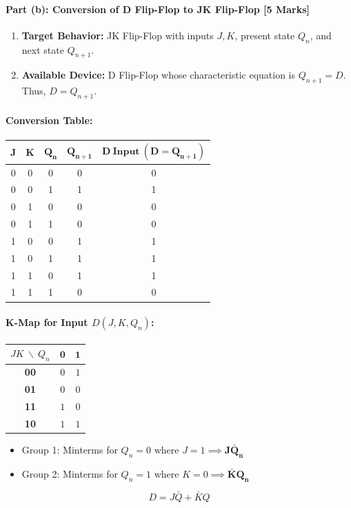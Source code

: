 \documentclass[11pt,a4paper,oneside]{book}
\begin{document}
\paragraph{Part (b): Conversion of D Flip-Flop to JK Flip-Flop [5 Marks]}
\begin{enumerate}
  \item \textbf{Target Behavior:} JK Flip-Flop with inputs $J, K$, present state $Q_n$, and next state $Q_{n+1}$.
  \item \textbf{Available Device:} D Flip-Flop whose characteristic equation is $Q_{n+1} = D$. Thus, $D = Q_{n+1}$.
\end{enumerate}

\paragraph{Conversion Table:}
\begin{center}
\begin{tabular}{|ccc||c||c|}
\hline
$\mathbf{J}$ & $\mathbf{K}$ & $\mathbf{Q_n}$ & $\mathbf{Q_{n+1}}$ & $\mathbf{D\ \text{Input}\ (D = Q_{n+1})}$ \\ \hline
0 & 0 & 0 & 0 & 0 \\ \hline
0 & 0 & 1 & 1 & 1 \\ \hline
0 & 1 & 0 & 0 & 0 \\ \hline
0 & 1 & 1 & 0 & 0 \\ \hline
1 & 0 & 0 & 1 & 1 \\ \hline
1 & 0 & 1 & 1 & 1 \\ \hline
1 & 1 & 0 & 1 & 1 \\ \hline
1 & 1 & 1 & 0 & 0 \\ \hline
\end{tabular}
\end{center}

\paragraph{K-Map for Input $D(J, K, Q_n)$:}
\begin{center}
\begin{tabular}{|c|c|c|}
\hline
$JK \ \backslash \ Q_n$ & $\mathbf{0}$ & $\mathbf{1}$ \\ \hline
\textbf{00} & $0$ & $1$ \\ \hline
\textbf{01} & $0$ & $0$ \\ \hline
\textbf{11} & $1$ & $0$ \\ \hline
\textbf{10} & $1$ & $1$ \\ \hline
\end{tabular}
\end{center}
\begin{itemize}
  \item Group 1: Minterms for $Q_n=0$ where $J=1 \implies \mathbf{J\bar{Q}_n}$
  \item Group 2: Minterms for $Q_n=1$ where $K=0 \implies \mathbf{\bar{K}Q_n}$
\end{itemize}
\[
D = J\bar{Q} + \bar{K}Q
\]
\end{document}
